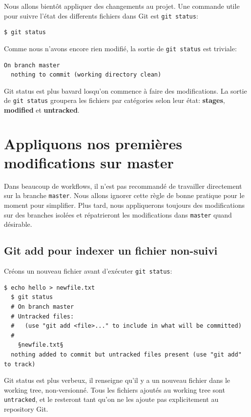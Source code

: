\documentclass{../../common/tufte-latex/tufte-handout}
\begin{document}
Nous allons bientôt appliquer des changements au projet.
Une commande utile pour suivre l'état des differents fichiers dans Git est \texttt{git status}:

\begin{lstlisting}[style=BashInputStyle]
  $ git status
\end{lstlisting}

Comme nous n'avons encore rien modifié, la sortie de \texttt{git status} est triviale:

\begin{lstlisting}[style=BashInputStyle]
  On branch master
  nothing to commit (working directory clean)
\end{lstlisting}

Git status est plus bavard losqu'on commence à faire des modifications.
La sortie de \texttt{git status} groupera les fichiers par catégories selon leur état: \textbf{stages}, \textbf{modified} et \textbf{untracked}.

\section{Appliquons nos premières modifications sur master}

Dans beaucoup de workflows, il n'est pas recommandé de travailler directement sur la branche \texttt{master}.
Nous allons ignorer cette règle de bonne pratique pour le moment pour simplifier.
Plus tard, nous appliquerons toujours des modifications sur des branches isolées et répatrieront les modifications dans \texttt{master} quand désirable.

\subsection{Git add pour indexer un fichier non-suivi}

Créons un nouveau fichier avant d'exécuter \texttt{git status}:

\begin{lstlisting}[style=BashInputStyle]
  $ echo hello > newfile.txt
  $ git status
  # On branch master
  # Untracked files:
  #   (use "git add <file>..." to include in what will be committed)
  #
    §newfile.txt§
  nothing added to commit but untracked files present (use "git add" to track)
\end{lstlisting}

Git status est plus verbeux, il renseigne qu'il y a un nouveau fichier dans le working tree, non-versionné.
Tous les fichiers ajoutés au working tree sont \texttt{untracked}, et le resteront tant qu'on ne les ajoute pas explicitement au repository Git.
\end{document}
